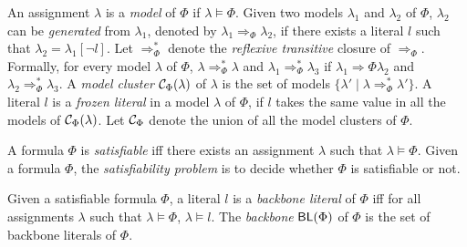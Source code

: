 An assignment $\lambda$ is a \emph{model} of $\Phi$ if $\lambda\models \Phi$.
Given two models $\lambda_1$ and $\lambda_2$ of $\Phi$, $\lambda_2$ can be \emph{generated} from $\lambda_1$, denoted by $\lambda_1\Rightarrow_\Phi\lambda_2$, if there exists a literal $l$ such that $\lambda_2=\lambda_1[\neg l]$.
Let $\Rightarrow^*_\Phi$ denote the \emph{reflexive transitive} closure of $\Rightarrow_\Phi$.
Formally, for every model $\lambda$ of $\Phi$, $\lambda\Rightarrow^*_\Phi\lambda$ and $\lambda_1\Rightarrow^*_\Phi\lambda_3$ if $\lambda_1\Rightarrow\Phi\lambda_2$ and $\lambda_2\Rightarrow^*_\Phi\lambda_3$.
A \emph{model cluster} $\mathcal{C}_\Phi(\lambda)$ of $\lambda$ is the set of models $\{\lambda'\mid \lambda\Rightarrow^*_\Phi\lambda'\}$.
A literal $l$ is a \emph{frozen literal} in a model $\lambda$ of $\Phi$, 
if $l$ takes the same value in all the models of $\mathcal{C}_\Phi(\lambda)$.   
Let $\mathcal{C}_\Phi$ denote the union of all the model clusters of $\Phi$.

 
A formula $\Phi$ is \emph{satisfiable} iff there exists an assignment $\lambda$ such that $\lambda\models \Phi$.
Given a formula $\Phi$, the \emph{satisfiability problem} is to decide whether $\Phi$ is satisfiable or not.

\smallskip

\begin{definition}[Backbone]
\label{def:backbone}
Given a satisfiable formula $\Phi$, a literal $l$ is a \emph{backbone literal} of $\Phi$ iff for all assignments $\lambda$ such that $\lambda\models\Phi$,
$\lambda\models l$. The \emph{backbone} $\textsf{BL}(\Phi)$ of $\Phi$ is the set of backbone literals of $\Phi$.
\end{definition}


